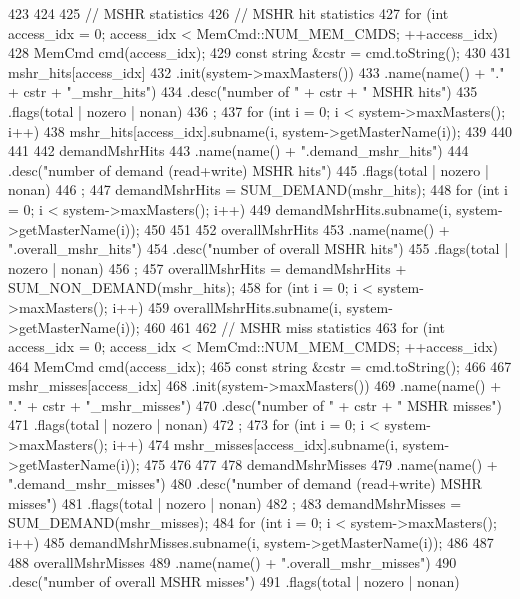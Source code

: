 \begin{DoxyCode}
{{423     }
424 
425     // MSHR statistics
426     // MSHR hit statistics
427     for (int access_idx = 0; access_idx < MemCmd::NUM_MEM_CMDS; ++access_idx) {
428         MemCmd cmd(access_idx);
429         const string &cstr = cmd.toString();
430 
431         mshr_hits[access_idx]
432             .init(system->maxMasters())
433             .name(name() + "." + cstr + "_mshr_hits")
434             .desc("number of " + cstr + " MSHR hits")
435             .flags(total | nozero | nonan)
436             ;
437         for (int i = 0; i < system->maxMasters(); i++) {
438             mshr_hits[access_idx].subname(i, system->getMasterName(i));
439         }
440     }
441 
442     demandMshrHits
443         .name(name() + ".demand_mshr_hits")
444         .desc("number of demand (read+write) MSHR hits")
445         .flags(total | nozero | nonan)
446         ;
447     demandMshrHits = SUM_DEMAND(mshr_hits);
448     for (int i = 0; i < system->maxMasters(); i++) {
449         demandMshrHits.subname(i, system->getMasterName(i));
450     }
451 
452     overallMshrHits
453         .name(name() + ".overall_mshr_hits")
454         .desc("number of overall MSHR hits")
455         .flags(total | nozero | nonan)
456         ;
457     overallMshrHits = demandMshrHits + SUM_NON_DEMAND(mshr_hits);
458     for (int i = 0; i < system->maxMasters(); i++) {
459         overallMshrHits.subname(i, system->getMasterName(i));
460     }
461 
462     // MSHR miss statistics
463     for (int access_idx = 0; access_idx < MemCmd::NUM_MEM_CMDS; ++access_idx) {
464         MemCmd cmd(access_idx);
465         const string &cstr = cmd.toString();
466 
467         mshr_misses[access_idx]
468             .init(system->maxMasters())
469             .name(name() + "." + cstr + "_mshr_misses")
470             .desc("number of " + cstr + " MSHR misses")
471             .flags(total | nozero | nonan)
472             ;
473         for (int i = 0; i < system->maxMasters(); i++) {
474             mshr_misses[access_idx].subname(i, system->getMasterName(i));
475         }
476     }
477 
478     demandMshrMisses
479         .name(name() + ".demand_mshr_misses")
480         .desc("number of demand (read+write) MSHR misses")
481         .flags(total | nozero | nonan)
482         ;
483     demandMshrMisses = SUM_DEMAND(mshr_misses);
484     for (int i = 0; i < system->maxMasters(); i++) {
485         demandMshrMisses.subname(i, system->getMasterName(i));
486     }
487 
488     overallMshrMisses
489         .name(name() + ".overall_mshr_misses")
490         .desc("number of overall MSHR misses")
491         .flags(total | nozero | nonan)
}
\end{DoxyCode}
